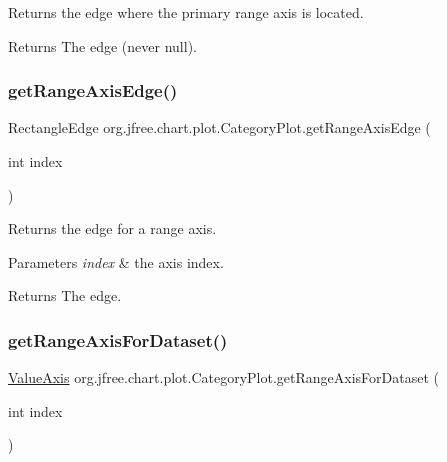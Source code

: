 Returns the edge where the primary range axis is located.

\begin{DoxyReturn}{Returns}
The edge (never {\ttfamily null}). 
\end{DoxyReturn}
\mbox{\label{classorg_1_1jfree_1_1chart_1_1plot_1_1_category_plot_aa0e7f350d90b1f27764cb9475244bfcc}} 
\subsubsection{\texorpdfstring{get\+Range\+Axis\+Edge()}{getRangeAxisEdge()}\hspace{0.1cm}{\footnotesize\ttfamily [2/2]}}
{\footnotesize\ttfamily Rectangle\+Edge org.\+jfree.\+chart.\+plot.\+Category\+Plot.\+get\+Range\+Axis\+Edge (\begin{DoxyParamCaption}\item[{int}]{index }\end{DoxyParamCaption})}

Returns the edge for a range axis.


\begin{DoxyParams}{Parameters}
{\em index} & the axis index.\\
\hline
\end{DoxyParams}
\begin{DoxyReturn}{Returns}
The edge. 
\end{DoxyReturn}
\mbox{\label{classorg_1_1jfree_1_1chart_1_1plot_1_1_category_plot_a23f209e7a7eb1f7370c361cd78cb6d68}} 
\subsubsection{\texorpdfstring{get\+Range\+Axis\+For\+Dataset()}{getRangeAxisForDataset()}}
{\footnotesize\ttfamily \mbox{\hyperlink{classorg_1_1jfree_1_1chart_1_1axis_1_1_value_axis}{Value\+Axis}} org.\+jfree.\+chart.\+plot.\+Category\+Plot.\+get\+Range\+Axis\+For\+Dataset (\begin{DoxyParamCaption}\item[{int}]{index }\end{DoxyParamCaption})}

